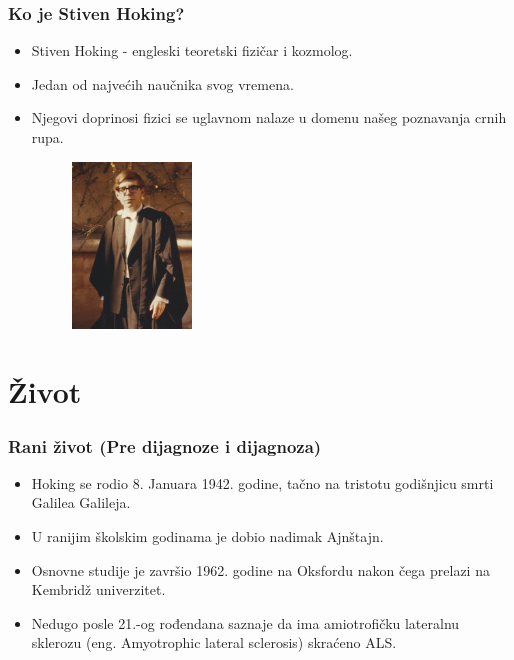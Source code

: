 \documentclass{beamer}
\begin{document}
\begin{frame}[fragile]\frametitle{Ko je Stiven Hoking?}
	\begin{itemize} \fontsize{9}{6}\selectfont	
			\item  Stiven Hoking - engleski teoretski fizičar i kozmolog. 
  \item Jedan od najvećih naučnika svog vremena.
  \item Njegovi doprinosi fizici se uglavnom nalaze u domenu našeg poznavanja crnih rupa.
\begin{figure}[h!]
  \centering
  \includegraphics[width=0.3\textwidth]{Hoking,PreDijagnoze.jpg}
  \captionsetup{font=small}{Slika1: Hoking, na dodeli diploma 1960.}
  \label{fig:Hoking,PreDijagnoze}
  \end{figure}
	\end{itemize}
\end{frame}

\section{Život}
\begin{frame}[fragile]\frametitle{Rani život (Pre dijagnoze i dijagnoza)}
\begin{itemize}	 \fontsize{9}{6}\selectfont
		
\item  Hoking se rodio 8. Januara 1942. godine, tačno na tristotu godišnjicu smrti Galilea Galileja.
\item  U ranijim školskim godinama je dobio nadimak Ajnštajn.
\item  Osnovne studije je završio 1962. godine na Oksfordu nakon čega prelazi na Kembridž univerzitet.
\item  Nedugo posle 21.-og rođendana saznaje da ima amiotrofičku lateralnu sklerozu (eng. Amyotrophic lateral sclerosis) skraćeno ALS.
\end{itemize}
\end{frame}
\end{document}
